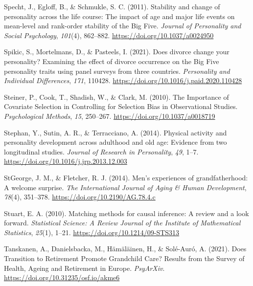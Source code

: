 \documentclass[
  english,
  man, noextraspace]{apa7}
\begin{document}
\leavevmode\hypertarget{ref-spechtStabilityChangePersonality2011}{}%
Specht, J., Egloff, B., \& Schmukle, S. C. (2011). Stability and change of personality across the life course: The impact of age and major life events on mean-level and rank-order stability of the Big Five. \emph{Journal of Personality and Social Psychology}, \emph{101}(4), 862--882. \url{https://doi.org/10.1037/a0024950}

\leavevmode\hypertarget{ref-spikicDoesDivorceChange2021}{}%
Spikic, S., Mortelmans, D., \& Pasteels, I. (2021). Does divorce change your personality? Examining the effect of divorce occurrence on the Big Five personality traits using panel surveys from three countries. \emph{Personality and Individual Differences}, \emph{171}, 110428. \url{https://doi.org/10.1016/j.paid.2020.110428}

\leavevmode\hypertarget{ref-steinerImportanceCovariateSelection2010}{}%
Steiner, P., Cook, T., Shadish, W., \& Clark, M. (2010). The Importance of Covariate Selection in Controlling for Selection Bias in Observational Studies. \emph{Psychological Methods}, \emph{15}, 250--267. \url{https://doi.org/10.1037/a0018719}

\leavevmode\hypertarget{ref-stephanPhysicalActivityPersonality2014}{}%
Stephan, Y., Sutin, A. R., \& Terracciano, A. (2014). Physical activity and personality development across adulthood and old age: Evidence from two longitudinal studies. \emph{Journal of Research in Personality}, \emph{49}, 1--7. \url{https://doi.org/10.1016/j.jrp.2013.12.003}

\leavevmode\hypertarget{ref-stgeorgeMenExperiencesGrandfatherhood2014}{}%
StGeorge, J. M., \& Fletcher, R. J. (2014). Men's experiences of grandfatherhood: A welcome surprise. \emph{The International Journal of Aging \& Human Development}, \emph{78}(4), 351--378. \url{https://doi.org/10.2190/AG.78.4.c}

\leavevmode\hypertarget{ref-stuartMatchingMethodsCausal2010}{}%
Stuart, E. A. (2010). Matching methods for causal inference: A review and a look forward. \emph{Statistical Science: A Review Journal of the Institute of Mathematical Statistics}, \emph{25}(1), 1--21. \url{https://doi.org/10.1214/09-STS313}

\leavevmode\hypertarget{ref-tanskanenDoesTransitionRetirement2021}{}%
Tanskanen, A., Danielsbacka, M., Hämäläinen, H., \& Solé-Auró, A. (2021). Does Transition to Retirement Promote Grandchild Care? Results from the Survey of Health, Ageing and Retirement in Europe. \emph{PsyArXiv}. \url{https://doi.org/10.31235/osf.io/akme6}
\end{document}
